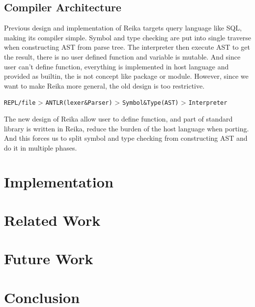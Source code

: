 \documentclass{article}
\begin{document}
\subsection{Compiler Architecture}
\label{subsec:compiler-architecture}

Previous design and implementation of Reika targets query language like SQL, making its compiler simple.
Symbol and type checking are put into single traverse when constructing AST from parse tree.
The interpreter then execute AST to get the result, there is no user defined function and variable is mutable.
And since user can't define function, everything is implemented in host language and provided as builtin,
the is not concept like package or module.
However, since we want to make Reika more general, the old design is too restrictive.

\begin{center}
  \verb+REPL/file+ > \verb+ANTLR(lexer&Parser)+ > \verb+Symbol&Type(AST)+ > \verb+Interpreter+
\end{center}

The new design of Reika allow user to define function, and part of standard library is written in Reika,
reduce the burden of the host language when porting.
And this forces us to split symbol and type checking from constructing AST and do it in multiple phases.




\section{Implementation}
\label{sec:implementation}


\section{Related Work}
\label{sec:related-work}


\section{Future Work}
\label{sec:future-work}

\section{Conclusion}
\label{sec:conclusion}

\printbibliography
\end{document}
